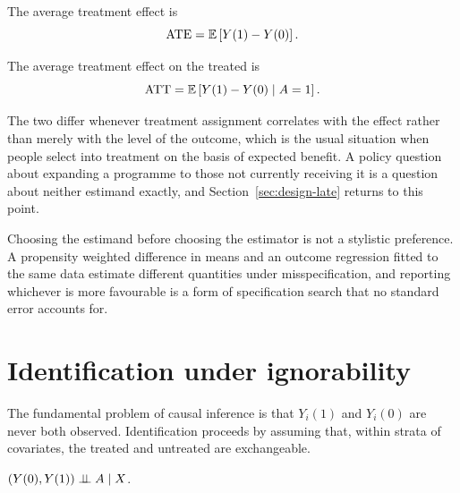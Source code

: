 \begin{definition}
\label{def:ate}
The average treatment effect is
\begin{equation*}
  \mathrm{ATE} = \mathbb{E}\left[ Y(1) - Y(0) \right].
\end{equation*}
\end{definition}

\begin{definition}
\label{def:att}
The average treatment effect on the treated is
\begin{equation*}
  \mathrm{ATT} = \mathbb{E}\left[ Y(1) - Y(0) \mid A = 1 \right].
\end{equation*}
\end{definition}

The two differ whenever treatment assignment correlates with the effect rather
than merely with the level of the outcome, which is the usual situation when
people select into treatment on the basis of expected benefit. A policy question
about expanding a programme to those not currently receiving it is a question
about neither estimand exactly, and Section~\ref{sec:design-late} returns to
this point.

\begin{remark}
\label{rem:estimand-first}
Choosing the estimand before choosing the estimator is not a stylistic
preference. A propensity weighted difference in means and an outcome regression
fitted to the same data estimate different quantities under misspecification,
and reporting whichever is more favourable is a form of specification search
that no standard error accounts for.
\end{remark}

\section{Identification under ignorability}
\label{sec:po-identification}

The fundamental problem of causal inference is that $Y_i(1)$ and $Y_i(0)$ are never both observed.
Identification proceeds by assuming that, within strata of covariates, the
treated and untreated are exchangeable.

\begin{assumption}
\label{ass:ignorability}
$\left( Y(0), Y(1) \right) \perp\!\!\!\perp A \mid X$.
\end{assumption}

